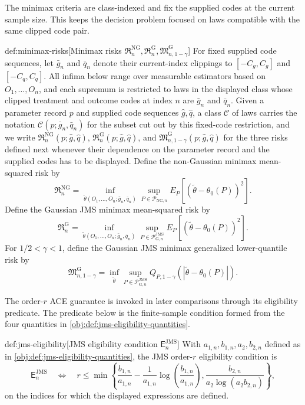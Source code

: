 The minimax criteria are class-indexed and fix the supplied codes at the current sample size. This keeps the decision problem focused on laws compatible with the same clipped code pair.

\begin{definitionv}{def:minimax-risks}[Minimax risks \(\mathfrak R_n^{\mathrm{NG}},\mathfrak R_n^{\mathrm G},\mathfrak M_{n,1-\gamma}^{\mathrm G}\)]
For fixed supplied code sequences, let \(\bar g_n\) and \(\bar q_n\) denote their current-index clippings to \([-C_g,C_g]\) and \([-C_q,C_q]\). All infima below range over measurable estimators based on \(O_1,\ldots,O_n\), and each supremum is restricted to laws in the displayed class whose clipped treatment and outcome codes at index \(n\) are \(\bar g_n\) and \(\bar q_n\). Given a parameter record \(p\) and supplied code sequences \(\widehat g,\widehat q\), a class \(\mathcal C\) of laws carries the notation \(\mathcal C(p;\bar g_n,\bar q_n)\) for the subset cut out by this fixed-code restriction, and we write \(\mathfrak R_n^{\mathrm{NG}}(p;\widehat g,\widehat q)\), \(\mathfrak R_n^{\mathrm G}(p;\widehat g,\widehat q)\), and \(\mathfrak M_{n,1-\gamma}^{\mathrm G}(p;\widehat g,\widehat q)\) for the three risks defined next whenever their dependence on the parameter record and the supplied codes has to be displayed. Define the non-Gaussian minimax mean-squared risk by
\[
\mathfrak R_n^{\mathrm{NG}}
=
\inf_{\widetilde\theta(O_1,\ldots,O_n;\bar g_n,\bar q_n)}
\sup_{P\in\mathcal P_{\mathrm{NG},n}}
E_P\!\left[(\widetilde\theta-\theta_0(P))^2\right].
\]
Define the Gaussian JMS minimax mean-squared risk by
\[
\mathfrak R_n^{\mathrm G}
=
\inf_{\widetilde\theta(O_1,\ldots,O_n;\bar g_n,\bar q_n)}
\sup_{P\in\mathcal P_{\mathrm G,n}^{\mathrm{JMS}}}
E_P\!\left[(\widetilde\theta-\theta_0(P))^2\right].
\]
For \(1/2<\gamma<1\), define the Gaussian JMS minimax generalized lower-quantile risk by
\[
\mathfrak M_{n,1-\gamma}^{\mathrm G}
=
\inf_{\widetilde\theta}
\sup_{P\in\mathcal P_{\mathrm G,n}^{\mathrm{JMS}}}
Q_{P,1-\gamma}\!\left(|\widetilde\theta-\theta_0(P)|\right).
\]
\end{definitionv}

The order-\(r\) ACE guarantee is invoked in later comparisons through its eligibility predicate. The predicate below is the finite-sample condition formed from the four quantities in \cref{obj:def:jms-eligibility-quantities}.

\begin{definitionv}{def:jms-eligibility}[JMS eligibility condition \(\mathsf E_n^{\mathrm{JMS}}\)]
With \(a_{1,n},b_{1,n},a_2,b_{2,n}\) defined as in \cref{obj:def:jms-eligibility-quantities}, the JMS order-\(r\) eligibility condition is
\[
\mathsf E_n^{\mathrm{JMS}}
\quad\Longleftrightarrow\quad
r\le
\min\left\{
\frac{b_{1,n}}{a_{1,n}}
-\frac{1}{a_{1,n}}\log\left(\frac{b_{1,n}}{a_{1,n}}\right),
\frac{b_{2,n}}{a_2\log(a_2b_{2,n})}
\right\},
\]
on the indices for which the displayed expressions are defined.
\end{definitionv}

